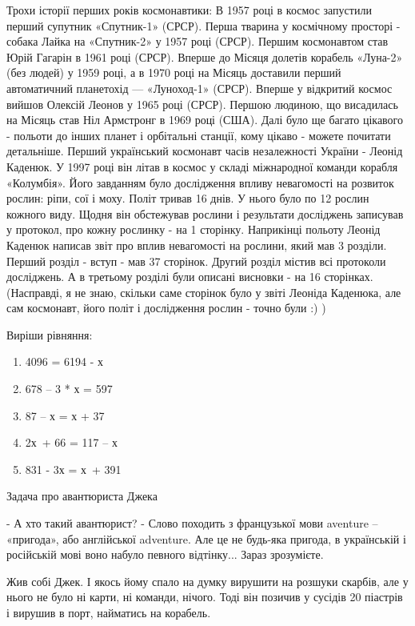 Трохи історії перших років космонавтики:
В 1957 році в космос запустили перший супутник «Спутник-1» (СРСР).
Перша тварина у космічному просторі - собака Лайка на «Спутник-2»
у 1957 році (СРСР).
Першим космонавтом став Юрій Гагарін в 1961 році (СРСР).
Вперше до Місяця долетів корабель «Луна-2» (без людей) у 1959 році,
а в 1970 році на Місяць доставили перший автоматичний планетохід —
«Луноход-1» (СРСР).
Вперше у відкритий космос вийшов Олексій Леонов у 1965 році (СРСР).
Першою людиною, що висадилась на Місяць став Ніл Армстронг в 1969 році (США).
Далі було ще багато цікавого - польоти до інших планет і орбітальні станції,
кому цікаво - можете почитати детальніше.
Перший український космонавт часів незалежності України - Леонід Каденюк.
У 1997 році він літав в космос у складі міжнародної команди корабля «Колумбія».
Його завданням було дослідження впливу невагомості на розвиток рослин:
ріпи, сої і моху. Політ тривав 16 днів. У нього було по 12 рослин кожного виду.
Щодня він обстежував рослини і результати досліджень записував у протокол,
про кожну рослинку - на 1 сторінку. Наприкінці польоту Леонід Каденюк
написав звіт про вплив невагомості на рослини, який мав 3 розділи.
Перший розділ - вступ - мав 37 сторінок. Другий розділ містив всі
протоколи досліджень. А в третьому розділі були описані висновки -
на 16 сторінках.
(Насправді, я не знаю, скільки саме сторінок було у звіті Леоніда Каденюка,
але сам космонавт, його політ і дослідження рослин - точно були :) )


\problem
Виріши рівняння:
\begin{multicols}{2}
    \begin{enumerate}
        \item 4096 = 6194 - х
        \item 678 – 3 * х = 597
        \item 87 – х = х + 37
        \item 2х + 66 = 117 – х
        \item 831 - 3х = х + 391
    \end{enumerate}
\end{multicols}


\problem
Задача про авантюриста Джека

- А хто такий авантюрист?
- Слово походить з французької мови aventure – «пригода»,
або англійської adventure. Але це не будь-яка пригода,
в українській і російській мові воно набуло певного відтінку...
Зараз зрозумієте.

Жив собі Джек. І якось йому спало на думку вирушити на розшуки скарбів,
але у нього не було ні карти, ні команди, нічого. Тоді він позичив
у сусідів 20 піастрів і вирушив в порт, найматись на корабель.

